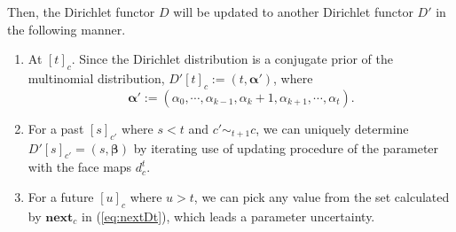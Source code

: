 \documentclass[12pt, a4paper]{amsart}
\theoremstyle{plain}
\theoremstyle{definition}
\numberwithin{figure}{section}
\numberwithin{table}{section}
\newcommand{\twc}[2]{ %
  [ #1 ]_{ #2 }
}
\newcommand{\newword}[1]{\textbf{\textit{#1}}}
\newcommand{\textred}[1]{#1}
\newcommand{\textblue}[1]{#1}
\numberwithin{equation}{section}
\begin{document}
Then,
the Dirichlet functor
$D$
will be updated to
another Dirichlet functor
$
\textred{
D'
}
$
in the following manner.
\begin{enumerate}
\item
At
$
\twc{t}{c}
$.
Since the Dirichlet distribution is a 
conjugate prior
of the multinomial distribution,
$
D'[t]_c
	:=
(t, 
	\boldsymbol{\alpha}'
)
$,
where
\[
\textred{
\boldsymbol{\alpha}'
}
	:=
(
\alpha_0, \cdots, \alpha_{k-1},
	\alpha_k \textblue{+ 1},
\alpha_{k+1}, \cdots, \alpha_t
).
\]

\item
For a past
$
\twc{s}{c'}
$
where
$s < t$
and
$
c' \sim_{t+1} c
$,
we can \textblue{uniquely} determine
$
D'[s]_{c'}
	=
(s, \textred{\boldsymbol{\beta}})
$
by iterating use of updating procedure of the parameter
with the face maps
$
d^t_{c}
$.

\item
For a future
$
\twc{u}{c}
$
where
$u > t$,
we can pick any value from the set calculated by
$\mathbf{next}_c$
in (\ref{eq:nextDt}),
which leads a \textblue{parameter uncertainty}.

\end{enumerate}
\end{document}

